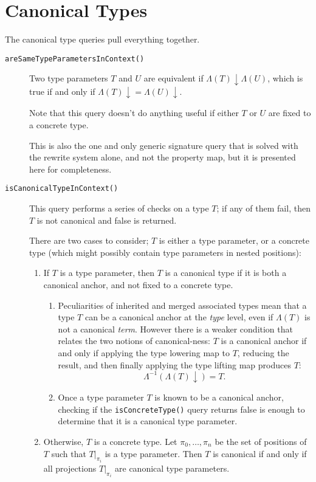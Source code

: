 \documentclass[headsepline,bibliography=totoc]{scrreport}
\theoremstyle{definition}
\theoremstyle{definition}
\theoremstyle{definition}
\begin{document}
\section{Canonical Types}
The canonical type queries pull everything together.
\begin{description}
\item[\texttt{areSameTypeParametersInContext()}] Two type parameters $T$ and $U$ are equivalent if $\Lambda(T)\downarrow\Lambda(U)$, which is true if and only if $\Lambda(T){\downarrow}=\Lambda(U){\downarrow}$.

Note that this query doesn't do anything useful if either $T$ or $U$ are fixed to a concrete type.

This is also the one and only generic signature query
that is solved with the rewrite system alone, and not the property map, but it is presented here for completeness.
\item[\texttt{isCanonicalTypeInContext()}] This query performs a series of checks on a type $T$; if any of them fail, then $T$ is not canonical and false is returned.

There are two cases to consider; $T$ is either a type parameter, or a concrete type (which might possibly contain type parameters in nested positions):
\begin{enumerate}
\item If $T$ is a type parameter, then $T$ is a canonical type if it is both a canonical anchor, and not fixed to a concrete type.
\begin{enumerate}
\item
Peculiarities of inherited and merged associated types mean that a type $T$ can be a canonical anchor at the \emph{type} level, even if $\Lambda(T)$ is not a canonical \emph{term}. However there is a weaker condition that relates the two notions of canonical-ness: $T$ is a canonical anchor if and only if applying the type lowering map to $T$, reducing the result, and then finally applying the type lifting map produces $T$:
\[\Lambda^{-1}(\Lambda(T){\downarrow})=T.\]
\item
Once a type parameter $T$ is known to be a canonical anchor, checking if the \texttt{isConcreteType()} query returns false is enough to determine that it is a canonical type parameter.
\end{enumerate}
\item Otherwise, $T$ is a concrete type. Let $\pi_0,\ldots,\pi_n$ be the set of positions of $T$ such
that $T|_{\pi_i}$ is a type parameter. Then $T$ is canonical if and only if all
projections $T|_{\pi_i}$ are canonical type parameters.
\end{enumerate}


\end{description}
\end{document}
